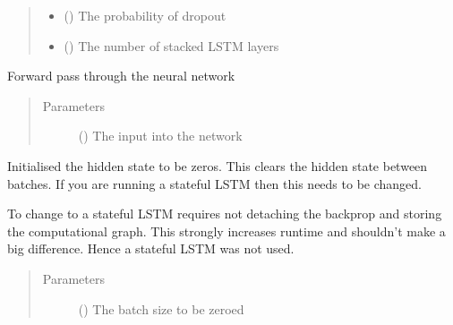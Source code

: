 \documentclass[letterpaper,10pt,english]{sphinxmanual}
\begin{document}
\begin{fulllineitems}
\begin{quote}
\begin{description}
\begin{itemize}
\item {} 
 () \textendash{} The probability of dropout

\item {} 
 () \textendash{} The number of stacked LSTM layers

\end{itemize}

\end{description}\end{quote}

\begin{fulllineitems}
\label{\detokenize{models:Foresight.models.LSTM_shallow.forward}}
Forward pass through the neural network
\begin{quote}\begin{description}
\item[{Parameters}] \leavevmode
{} () \textendash{} The input into the network

\end{description}\end{quote}

\end{fulllineitems}


\begin{fulllineitems}
\label{\detokenize{models:Foresight.models.LSTM_shallow.init_hidden}}
Initialised the hidden state to be zeros. This clears the hidden
state between batches. If you are running a stateful LSTM then this
needs to be changed.

To change to a stateful LSTM requires not detaching the backprop and
storing the computational graph. This strongly increases runtime and
shouldn’t make a big difference. Hence a stateful LSTM was not used.
\begin{quote}\begin{description}
\item[{Parameters}] \leavevmode
{} () \textendash{} The batch size to be zeroed

\end{description}\end{quote}

\end{fulllineitems}


\end{fulllineitems}
\end{document}
